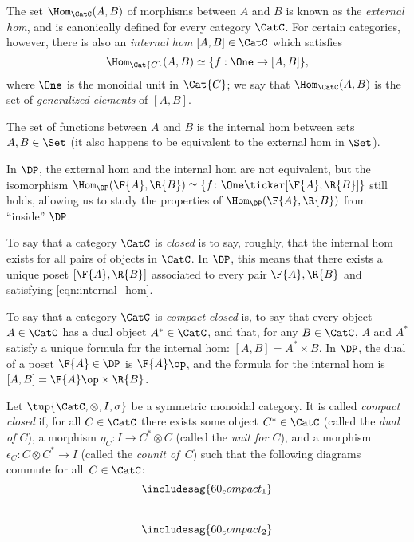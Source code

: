 \begin{ctdefinition}
The set $\Hom_\CatC(A,B)$ of morphisms between $A$ and $B$ is known as the \emph{external hom}, and is canonically defined for every category $\CatC$. For certain categories, however, there is also an \emph{internal hom} $[A,B] \in \CatC$ which satisfies
\begin{equation}
\label{eqn:internal_hom}
\Hom_\Cat{C}(A,B) \simeq \{ f : \One \to [A,B] \},
\end{equation}
where $\One$ is the monoidal unit in $\Cat{C}$; we say that $\Hom_\CatC(A,B)$ is the set of \emph{generalized elements} of $[A,B]$.
\end{ctdefinition}

\begin{example}
The set of functions between $A$ and $B$ is the internal hom between sets $A,B \in \Set$ (it also happens to be equivalent to the external hom in $\Set$).
\end{example}

In $\DP$, the external hom and the internal hom are not equivalent, but the isomorphism $\Hom_\DP(\F{A},\R{B}) \simeq \{ f \colon \One \tickar [\F{A},\R{B}] \}$ still holds, allowing us to study the properties of $\Hom_\DP(\F{A},\R{B})$ from ``inside'' $\DP$.

To say that a category $\CatC$ is \emph{closed} is to say, roughly, that the internal hom exists for all pairs of objects in $\CatC$. In $\DP$, this means that there exists a unique poset $[\F{A},\R{B}]$ associated to every pair $\F{A},\R{B}$ and satisfying \cref{eqn:internal_hom}.

To say that a category $\CatC$ is \emph{compact closed} is, to say that every object $A \in \CatC$ has a dual object $A^* \in \CatC$, and that, for any $B \in \CatC$, $A$ and $A^*$ satisfy a unique formula for the internal hom: $[A,B] = A^* \times B$. In $\DP$, the dual of a poset $\F{A} \in \DP$ is $\F{A}\op$, and the formula for the internal hom is $[A,B]=\F{A}\op \times \R{B}$.

\begin{ctdefinition}
Let $\tup{\CatC,\otimes,I,\sigma}$ be a symmetric monoidal category. It is called \emph{compact closed} if, for all $C \in\CatC$ there exists some object $C^*\in\CatC$ (called the \emph{dual of $C$}), a morphism $\eta_C\colon I\to C^*\otimes C$ (called the \emph{unit for $C$}), and a morphism $\epsilon_C\colon C\otimes C^*\to I$ (called the \emph{counit of~$C$}) such that the following diagrams commute for all~$C\in \CatC$:
\begin{equation}\label{eqn:ccc}
\includesag{60_compact_1}
\end{equation}
~
\begin{equation}
    \includesag{60_compact_2}
\end{equation}
\end{ctdefinition}

